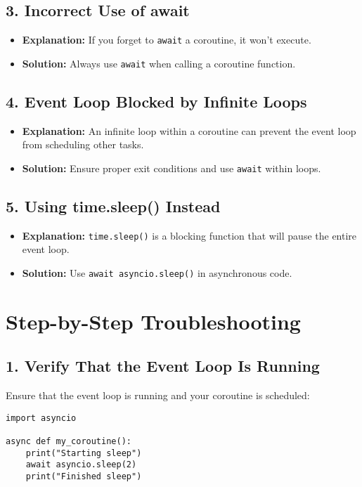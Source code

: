 \begin{tcolorbox}[
colback=pinkcolor!10!white,
colframe=pinkcolor!100!red,
left=2mm,
right=2mm,
title=\small\centering\textcolor{black}{Complete Guide to await asyncio.sleep() Issues},
breakable=true
]
\subsection*{3. Incorrect Use of await}
\begin{itemize}
\item \textbf{Explanation:} If you forget to \texttt{await} a coroutine, it won't execute.
\item \textbf{Solution:} Always use \texttt{await} when calling a coroutine function.
\end{itemize}

\subsection*{4. Event Loop Blocked by Infinite Loops}
\begin{itemize}
\item \textbf{Explanation:} An infinite loop within a coroutine can prevent the event loop from scheduling other tasks.
\item \textbf{Solution:} Ensure proper exit conditions and use \texttt{await} within loops.
\end{itemize}

\subsection*{5. Using time.sleep() Instead}
\begin{itemize}
\item \textbf{Explanation:} \texttt{time.sleep()} is a blocking function that will pause the entire event loop.
\item \textbf{Solution:} Use \texttt{await asyncio.sleep()} in asynchronous code.
\end{itemize}

\section*{Step-by-Step Troubleshooting}

\subsection*{1. Verify That the Event Loop Is Running}
Ensure that the event loop is running and your coroutine is scheduled:

\begin{verbatim}
import asyncio

async def my_coroutine():
    print("Starting sleep")
    await asyncio.sleep(2)
    print("Finished sleep")


\end{verbatim}
\end{tcolorbox}
